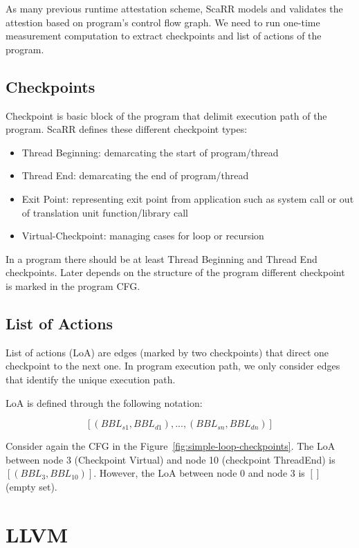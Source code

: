 As many previous runtime attestation scheme, ScaRR models and validates the
attestion based on program's control flow graph. We need to run one-time
measurement computation to extract checkpoints and list of actions of the
program.

\subsection{Checkpoints} \label{sec:scarr-checkpoints} Checkpoint is basic block
of the program that delimit execution path of the program. ScaRR defines these
different checkpoint types:
\begin{itemize}
    \item Thread Beginning: demarcating the start of program/thread
    \item Thread End: demarcating the end of program/thread
    \item Exit Point: representing exit point from application such as system
    call or out of translation unit function/library call
    \item Virtual-Checkpoint: managing cases for loop or recursion
\end{itemize}

In a program there should be at least Thread Beginning and Thread End
checkpoints. Later depends on the structure of the program different checkpoint
is marked in the program CFG.

\subsection{List of Actions}

List of actions (LoA) are edges (marked by two checkpoints) that direct one
checkpoint to the next one. In program execution path, we only consider edges
that identify the unique execution path.

LoA is defined through the following notation:


$$[(BBL_{s1},BBL_{d1}),...,(BBL_{sn},BBL_{dn})]$$

Consider again the CFG in the Figure~\ref{fig:simple-loop-checkpoints}. The LoA
between node 3 (Checkpoint Virtual) and node 10 (checkpoint ThreadEnd) is
$[(BBL_3, BBL_{10})]$. However, the LoA between node 0 and node 3 is $[]$ (empty
set).


\section{LLVM}
\label{sec:llvm}

